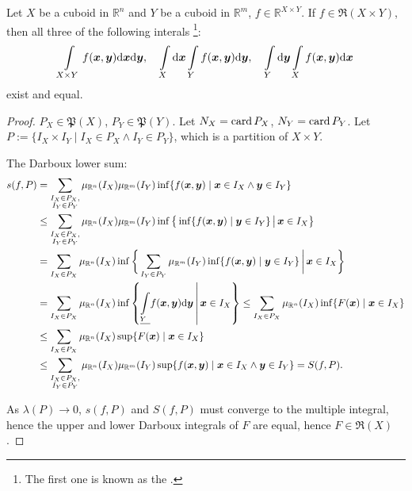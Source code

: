\documentclass[openany]{book}
\begin{document}
\begin{theorem}
	\label{theorem: Fubini's theorem}
	Let $X$ be a cuboid in $\mathbb R^n$ and $Y$ be a cuboid in $\mathbb R^m$, $f \in \mathbb R^{X \times Y}$. 
	If $f \in \mathfrak R(X \times Y)$, then all three of the following interals%
		\footnote{The first one is known as the .}:
	\begin{equation*}
		\int\limits_{X \times Y} f(\boldsymbol{x}, \boldsymbol{y}) \mathrm{d} \boldsymbol{x} \mathrm{d} \boldsymbol{y}, 
		\quad
		\int\limits_X \mathrm{d} \boldsymbol{x} \int\limits_Y  f(\boldsymbol{x}, \boldsymbol{y})  \mathrm{d} \boldsymbol{y}, 
		\quad
		\int\limits_Y \mathrm{d} \boldsymbol{y} \int\limits_X  f(\boldsymbol{x}, \boldsymbol{y})  \mathrm{d} \boldsymbol{x}
	\end{equation*}
	exist and equal.
\end{theorem}
\begin{proof}
	$P_X \in \mathfrak P(X)$, $P_Y \in \mathfrak P(Y)$. 
	Let $N_X = \operatorname{card} P_X$, $N_Y = \operatorname{card} P_Y$.
	Let $P := \{I_X \times I_Y \mid I_X \in P_X \wedge I_Y \in P_Y\}$, which is a partition of $X \times Y$.
	
	The Darboux lower sum:
	\begin{align*}
		s(f, P) &= \sum_{\substack{I_X \in P_X,\\ I_Y \in P_Y}} \mu_{\mathbb R^n}(I_X) \mu_{\mathbb R^m}(I_Y)
			\inf\{f(\boldsymbol{x}, \boldsymbol{y}) \mid \boldsymbol{x} \in I_X \wedge \boldsymbol{y} \in I_Y\}
		\\
		&\leq \sum_{\substack{I_X \in P_X,\\ I_Y \in P_Y}} 
			\mu_{\mathbb R^n}(I_X) \mu_{\mathbb R^m}(I_Y)
			\inf \big\{ \inf \{f(\boldsymbol{x}, \boldsymbol{y}) \mid \boldsymbol{y} \in I_Y  \} 
				\,\big\vert\, \boldsymbol{x} \in I_X \big\}
		\\
		&= \sum_{I_X \in P_X} \mu_{\mathbb R^n}(I_X) 
			\inf \bigg\{ \sum_{I_Y \in P_Y} \mu_{\mathbb R^m}(I_Y) 
				\inf \{ f(\boldsymbol{x}, \boldsymbol{y}) \mid  \boldsymbol{y} \in I_Y\} 
			\,\bigg\vert\, \boldsymbol{x} \in I_X \bigg\}
		\\
		&= \sum_{I_X \in P_X} \mu_{\mathbb R^n}(I_X) 
			\inf \left\{ 
				\underline{\int\limits_Y} f(\boldsymbol{x}, \boldsymbol{y}) \mathrm{d} \boldsymbol{y}
			\,\middle\vert\, 
				\boldsymbol{x} \in I_X 
			\right\} 
		\leq \sum_{I_X \in P_X} \mu_{\mathbb R^n}(I_X) 
			\inf \{ F(\boldsymbol{x}) \mid \boldsymbol{x} \in I_X \}
		\\
		&\leq \sum_{I_X \in P_X} \mu_{\mathbb R^n}(I_X) 
		\sup \{ F(\boldsymbol{x}) \mid \boldsymbol{x} \in I_X \}
		\\
		&\leq
		\sum_{\substack{I_X \in P_X,\\ I_Y \in P_Y}} \mu_{\mathbb R^n}(I_X) \mu_{\mathbb R^m}(I_Y)
		\sup\{f(\boldsymbol{x}, \boldsymbol{y}) \mid \boldsymbol{x} \in I_X \wedge \boldsymbol{y} \in I_Y\}
		= S(f, P).
	\end{align*}

	As $\lambda(P) \to 0$, $s(f, P)$ and $S(f, P)$ must converge to the multiple integral, hence the upper and lower Darboux integrals of $F$ are equal, hence $F \in \mathfrak R(X)$.
\end{proof}
\end{document}
